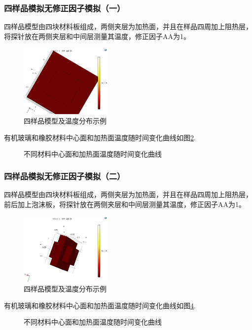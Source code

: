 \documentclass[10pt,a4paper,twoside,UTF8]{ctexart}
\begin{document}
\subsubsection{四样品模拟无修正因子模拟（一）}
四样品模型由四块材料板组成，两侧夹层为加热面，并且在样品四周加上阻热层，将探针放在两侧夹层和中间层测量其温度，修正因子AA为1。
\begin{figure}[H]
	\centering
	\includegraphics[width=0.4\textwidth]{C8.3/Mod3 glass/b.png}
	\caption{四样品模型及温度分布示例}
	\label{fig: 4_1}
\end{figure}

有机玻璃和橡胶材料中心面和加热面温度随时间变化曲线如图\ref{fig: Mod3}.
\begin{figure}[H]
	\centering
	\caption{不同材料中心面和加热面温度随时间变化曲线}
	\label{fig: Mod3}
\end{figure}

\subsubsection{四样品模拟无修正因子模拟（二）}
四样品模型由四块材料板组成，两侧夹层为加热面，并且在样品四周加上阻热层，前后加上泡沫板，将探针放在两侧夹层和中间层测量其温度，修正因子AA为1。
\begin{figure}[H]
	\centering
	\includegraphics[width=0.4\textwidth]{C8.3/Mod4 glass/b.png}
	\caption{四样品模型及温度分布示例}
	\label{fig: 4_2}
\end{figure}

有机玻璃和橡胶材料中心面和加热面温度随时间变化曲线如图\ref{fig: Mod4}.
\begin{figure}[H]
	\centering
	\caption{不同材料中心面和加热面温度随时间变化曲线}
	\label{fig: Mod4}
\end{figure}
\end{document}
